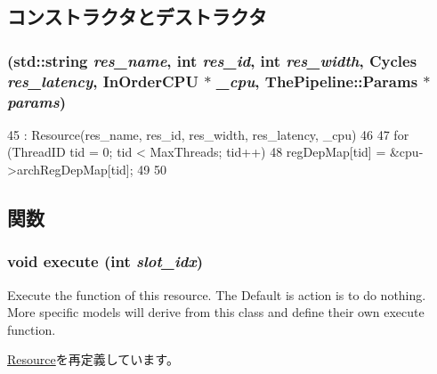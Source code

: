 \subsection{コンストラクタとデストラクタ}
\hypertarget{classDecodeUnit_a1e59768581eb70852e4d620f3fdee401}{
\subsubsection[{DecodeUnit}]{ (std::string {\em res\_\-name}, \/  int {\em res\_\-id}, \/  int {\em res\_\-width}, \/  {\bf Cycles} {\em res\_\-latency}, \/  {\bf InOrderCPU} $\ast$ {\em \_\-cpu}, \/  {\bf ThePipeline::Params} $\ast$ {\em params})}}
\label{classDecodeUnit_a1e59768581eb70852e4d620f3fdee401}



\begin{DoxyCode}
45     : Resource(res_name, res_id, res_width, res_latency, _cpu)
46 {
47     for (ThreadID tid = 0; tid < MaxThreads; tid++) {
48         regDepMap[tid] = &cpu->archRegDepMap[tid];
49     }
50 }
\end{DoxyCode}


\subsection{関数}
\hypertarget{classDecodeUnit_a7b7fff82f8c9cbdb02add1346f60bb9e}{
\subsubsection[{execute}]{\setlength{\rightskip}{0pt plus 5cm}void execute (int {\em slot\_\-idx})}}
\label{classDecodeUnit_a7b7fff82f8c9cbdb02add1346f60bb9e}
Execute the function of this resource. The Default is action is to do nothing. More specific models will derive from this class and define their own execute function. 

\hyperlink{classResource_a39af49c5568d1db3f53c12d7d6914c32}{Resource}を再定義しています。


